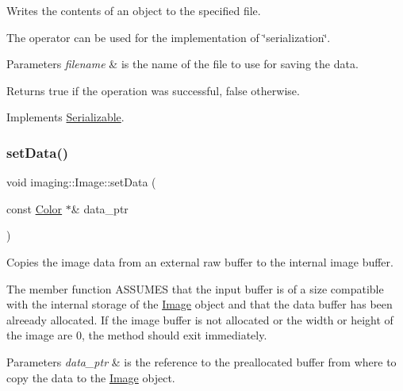 Writes the contents of an object to the specified file.

The operator can be used for the implementation of \char`\"{}serialization\char`\"{}.


\begin{DoxyParams}{Parameters}
{\em filename} & is the name of the file to use for saving the data.\\
\hline
\end{DoxyParams}
\begin{DoxyReturn}{Returns}
true if the operation was successful, false otherwise. 
\end{DoxyReturn}


Implements \hyperlink{class_serializable_a60c53d8ec7e38531699d1ca19642318d}{Serializable}.

\mbox{\label{classimaging_1_1_image_a5f586aaf4180937982608c9d48f0ae67}} 
\subsubsection{\texorpdfstring{set\+Data()}{setData()}}
{\footnotesize\ttfamily void imaging\+::\+Image\+::set\+Data (\begin{DoxyParamCaption}\item[{const \hyperlink{classmath_1_1_vec3}{Color} $\ast$\&}]{data\+\_\+ptr }\end{DoxyParamCaption})}

Copies the image data from an external raw buffer to the internal image buffer.

The member function A\+S\+S\+U\+M\+ES that the input buffer is of a size compatible with the internal storage of the \hyperlink{classimaging_1_1_image}{Image} object and that the data buffer has been alreeady allocated. If the image buffer is not allocated or the width or height of the image are 0, the method should exit immediately.


\begin{DoxyParams}{Parameters}
{\em data\+\_\+ptr} & is the reference to the preallocated buffer from where to copy the data to the \hyperlink{classimaging_1_1_image}{Image} object. \\
\hline
\end{DoxyParams}
\mbox{\label{classimaging_1_1_image_af46eb162fc02880e06d5029cb4c9b540}} 
